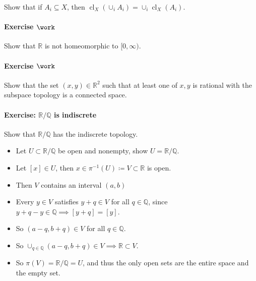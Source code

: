 Show that if \(A_i \subseteq X\), then
\({ \operatorname{cl}} _X(\cup_i A_i) = \cup_i { \operatorname{cl}} _X(A_i)\).

\hypertarget{exercise-work-3}{%
\paragraph{\texorpdfstring{Exercise
\(\work\)}{Exercise \textbackslash work}}\label{exercise-work-3}}

Show that \({\mathbb{R}}\) is not homeomorphic to \([0, \infty)\).

\hypertarget{exercise-work-4}{%
\paragraph{\texorpdfstring{Exercise
\(\work\)}{Exercise \textbackslash work}}\label{exercise-work-4}}

Show that the set \((x, y) \in {\mathbb{R}}^2\) such that at least one
of \(x, y\) is rational with the subspace topology is a connected space.

\hypertarget{exercise-mathbbrmathbbq-is-indiscrete}{%
\paragraph{\texorpdfstring{Exercise: \({\mathbb{R}}/{\mathbb{Q}}\) is
indiscrete}{Exercise: \{\textbackslash mathbb\{R\}\}/\{\textbackslash mathbb\{Q\}\} is indiscrete}}\label{exercise-mathbbrmathbbq-is-indiscrete}}

\begin{problem}[?]

Show that \({\mathbb{R}}/{\mathbb{Q}}\) has the indiscrete topology.

\end{problem}

\begin{solution}

\envlist

\begin{itemize}
\tightlist
\item
  Let \(U \subset {\mathbb{R}}/{\mathbb{Q}}\) be open and nonempty, show
  \(U = {\mathbb{R}}/{\mathbb{Q}}\).
\item
  Let \([x] \in U\), then
  \(x \in \pi^{-1}(U) \coloneqq V \subset{\mathbb{R}}\) is open.
\item
  Then \(V\) contains an interval \((a, b)\)
\item
  Every \(y\in V\) satisfies \(y+q \in V\) for all
  \(q\in {\mathbb{Q}}\), since
  \(y+q-y \in {\mathbb{Q}}\implies [y+q] = [y]\).
\item
  So \((a-q, b+q) \in V\) for all \(q\in {\mathbb{Q}}\).
\item
  So
  \(\cup_{q\in {\mathbb{Q}}}(a-q, b+q) \in V \implies {\mathbb{R}}\subset V\).
\item
  So \(\pi(V) = {\mathbb{R}}/{\mathbb{Q}}= U\), and thus the only open
  sets are the entire space and the empty set.
\end{itemize}

\end{solution}

